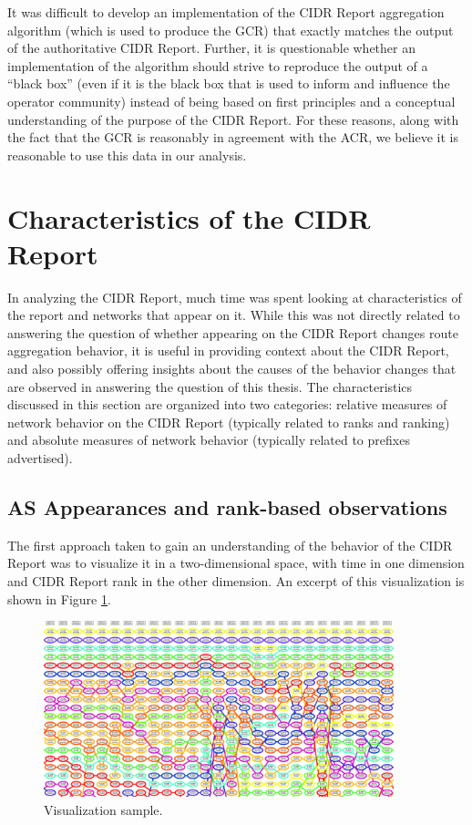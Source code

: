 It was difficult to develop an implementation of the CIDR Report aggregation
algorithm (which is used to produce the GCR) that exactly matches the output of
the authoritative CIDR Report. Further, it is questionable whether an
implementation of the algorithm should strive to reproduce the output of a
``black box'' (even if it is the black box that is used to inform and influence
the operator community) instead of being based on first principles and a
conceptual understanding of the purpose of the CIDR Report. For these reasons,
along with the fact that the GCR is reasonably in agreement with the ACR, we
believe it is reasonable to use this data in our analysis.

\section{Characteristics of the CIDR Report}
In analyzing the CIDR Report, much time was spent looking at characteristics of
the report and networks that appear on it. While this was not directly related
to answering the question of whether appearing on the CIDR Report changes route
aggregation behavior, it is useful in providing context about the CIDR Report,
and also possibly offering insights about the causes of the behavior changes
that are observed in answering the question of this thesis. The characteristics
discussed in this section are organized into two categories: relative measures
of network behavior on the CIDR Report (typically related to ranks and ranking)
and absolute measures of network behavior (typically related to prefixes
advertised).

\subsection{AS Appearances and rank-based observations}
The first approach taken to gain an understanding of the behavior of the CIDR
Report was to visualize it in a two-dimensional space, with time in one
dimension and CIDR Report rank in the other dimension. An excerpt of this
visualization is shown in Figure \ref{fig:viz_sample}.

\begin{figure}[h!]
\begin{centering}
\begin{singlespace}
    \includegraphics[width=4in]{figures/viz_sample.jpg}
    \caption{Visualization sample.}
    \label{fig:viz_sample}
\end{singlespace}
\end{centering}
\end{figure}

